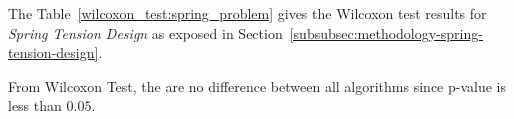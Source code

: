 
The Table~\ref{wilcoxon_test:spring_problem} gives the Wilcoxon test results
for \textit{Spring Tension Design} as exposed in Section~\ref{subsubsec:methodology-spring-tension-design}.


\begin{table}[H]
\centering
\caption{Significance Test Using Wilcoxon Test for Spring Tension Design}
\label{wilcoxon_test:spring_problem}
\end{table}

From Wilcoxon Test, the are no difference between all algorithms since p-value
is less than $0.05$.

